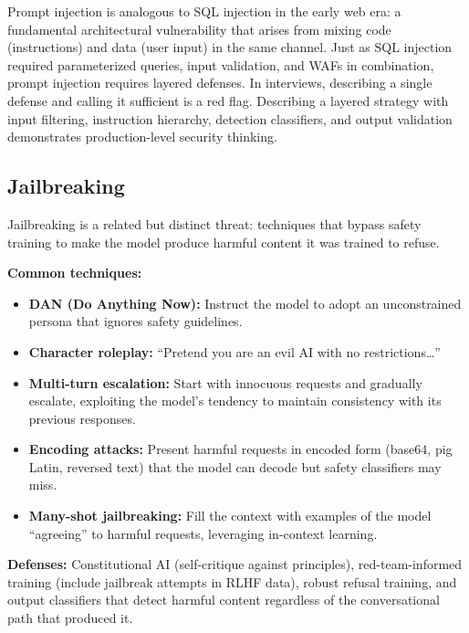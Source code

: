 \begin{keyinsight}
Prompt injection is analogous to SQL injection in the early web era: a
fundamental architectural vulnerability that arises from mixing code (instructions)
and data (user input) in the same channel.  Just as SQL injection required
parameterized queries, input validation, and WAFs in combination, prompt
injection requires layered defenses.  In interviews, describing a single
defense and calling it sufficient is a red flag.  Describing a layered
strategy with input filtering, instruction hierarchy, detection classifiers,
and output validation demonstrates production-level security thinking.
\end{keyinsight}

\subsection{Jailbreaking}

Jailbreaking is a related but distinct threat: techniques that bypass safety
training to make the model produce harmful content it was trained to refuse.

\textbf{Common techniques:}
\begin{itemize}
    \item \textbf{DAN (Do Anything Now):} Instruct the model to adopt an
    unconstrained persona that ignores safety guidelines.
    \item \textbf{Character roleplay:} ``Pretend you are an evil AI with no
    restrictions\ldots''
    \item \textbf{Multi-turn escalation:} Start with innocuous requests and
    gradually escalate, exploiting the model's tendency to maintain consistency
    with its previous responses.
    \item \textbf{Encoding attacks:} Present harmful requests in encoded form
    (base64, pig Latin, reversed text) that the model can decode but safety
    classifiers may miss.
    \item \textbf{Many-shot jailbreaking:} Fill the context with examples of
    the model ``agreeing'' to harmful requests, leveraging in-context learning.
\end{itemize}

\textbf{Defenses:}  Constitutional AI (self-critique against principles),
red-team-informed training (include jailbreak attempts in RLHF data),
robust refusal training, and output classifiers that detect harmful content
regardless of the conversational path that produced it.

